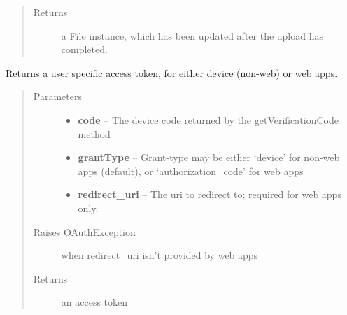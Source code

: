 \documentclass[letterpaper,10pt,english]{sphinxmanual}
\begin{document}
\begin{fulllineitems}
\begin{fulllineitems}
\begin{quote}
\begin{description}
\begin{itemize}
\end{itemize}

\item[{Returns}] \leavevmode
a File instance, which has been updated after the upload has completed.

\end{description}\end{quote}

\end{fulllineitems}


\begin{fulllineitems}
\label{Available modules:BaseSpacePy.api.BaseSpaceAPI.BaseSpaceAPI.obtainAccessToken}
Returns a user specific access token, for either device (non-web) or web apps.
\begin{quote}\begin{description}
\item[{Parameters}] \leavevmode\begin{itemize}
\item {} 
\textbf{code} -- The device code returned by the getVerificationCode method

\item {} 
\textbf{grantType} -- Grant-type may be either `device' for non-web apps (default), or `authorization\_code' for web apps

\item {} 
\textbf{redirect\_uri} -- The uri to redirect to; required for web apps only.

\end{itemize}

\item[{Raises OAuthException}] \leavevmode
when redirect\_uri isn't provided by web apps

\item[{Returns}] \leavevmode
an access token

\end{description}\end{quote}

\end{fulllineitems}



\end{fulllineitems}
\end{document}
